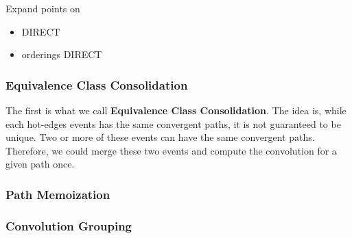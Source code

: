 \documentclass[10pt,sigconf,letterpaper,anonymous,nonacm]{acmart}
\begin{document}
Expand points on 
\begin{itemize}
    \item DIRECT 
    \item orderings DIRECT
\end{itemize}

\subsubsection{Equivalence Class Consolidation}
The first is what we call \textbf{Equivalence Class Consolidation}. 
The idea is, while each hot-edges events has the same convergent paths, it is not guaranteed to be 
unique. 
Two or more of these events can have the same convergent paths.
Therefore, we could merge these two events and compute the convolution for a given path once.

\subsubsection{Path Memoization}

\subsubsection{Convolution Grouping}



\end{document}
